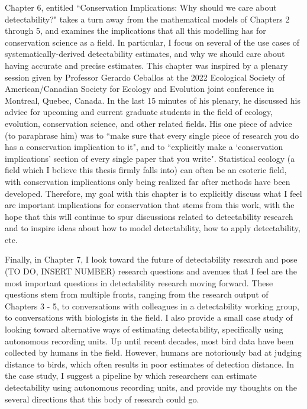 \par Chapter 6, entitled ``Conservation Implications: Why should we care about detectability?" takes a turn away from the mathematical models of Chapters 2 through 5, and examines the implications that all this modelling has for conservation science as a field.
In particular, I focus on several of the use cases of systematically-derived detectability estimates, and why we should care about having accurate and precise estimates.
This chapter was inspired by a plenary session given by Professor Gerardo Ceballos at the 2022 Ecological Society of American/Canadian Society for Ecology and Evolution joint conference in Montreal, Quebec, Canada.
In the last 15 minutes of his plenary, he discussed his advice for upcoming and current graduate students in the field of ecology, evolution, conservation science, and other related fields.
His one piece of advice (to paraphrase him) was to ``make sure that every single piece of research you do has a conservation implication to it", and to ``explicitly make a `conservation implications' section of every single paper that you write".
Statistical ecology (a field which I believe this thesis firmly falls into) can often be an esoteric field, with conservation implications only being realized far after methods have been developed.
Therefore, my goal with this chapter is to explicitly discuss what I feel are important implications for conservation that stems from this work, with the hope that this will continue to spur discussions related to detectability research and to inspire ideas about how to model detectability, how to apply detectability, etc.

\par Finally, in Chapter 7, I look toward the future of detectability research and pose (TO DO, INSERT NUMBER) research questions and avenues that I feel are the most important questions in detectability research moving forward.
These questions stem from multiple fronts, ranging from the research output of Chapters 3 - 5, to conversations with colleagues in a detectability working group, to conversations with biologists in the field.
I also provide a small case study of looking toward alternative ways of estimating detectability, specifically using autonomous recording units.
Up until recent decades, most bird data have been collected by humans in the field.
However, humans are notoriously bad at judging distance to birds, which often results in poor estimates of detection distance.
In the case study, I suggest a pipeline by which researchers can estimate detectability using autonomous recording units, and provide my thoughts on the several directions that this body of research could go.

